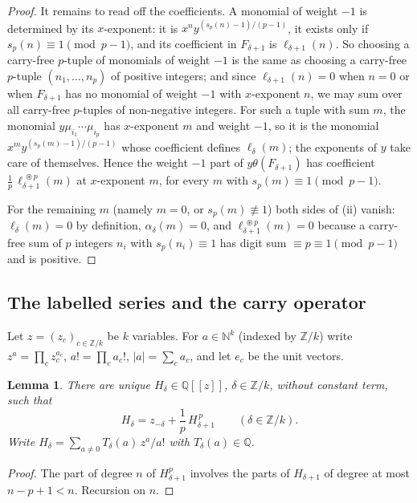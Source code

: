 \documentclass[11pt]{article}
\newtheorem{lemma}[theorem]{Lemma}
\theoremstyle{definition}
\theoremstyle{remark}
\numberwithin{equation}{section}
\numberwithin{figure}{section}
\newcommand{\Z}{\mathbb Z}
\newcommand{\Q}{\mathbb Q}
\newcommand{\N}{\mathbb N}
\newcommand{\cf}{\circledast}
\begin{document}
\begin{proof}
It remains to read off the coefficients. A monomial of weight $-1$ is determined by its
$x$-exponent: it is $x^ny^{(s_p(n)-1)/(p-1)}$, it exists only if $s_p(n)\equiv1\pmod{p-1}$,
and its coefficient in $F_{\delta+1}$ is $\ell_{\delta+1}(n)$. So choosing a carry-free
$p$-tuple of monomials of weight $-1$ is the same as choosing a carry-free $p$-tuple
$(n_1,\dots,n_p)$ of positive integers; and since $\ell_{\delta+1}(n)=0$ when $n=0$ or when
$F_{\delta+1}$ has no monomial of weight $-1$ with $x$-exponent $n$, we may sum over all
carry-free $p$-tuples of non-negative integers. For such a tuple with sum $m$, the monomial
$y\mu_{i_1}\cdots\mu_{i_p}$ has $x$-exponent $m$ and weight $-1$, so it is the monomial
$x^my^{(s_p(m)-1)/(p-1)}$ whose coefficient defines $\ell_\delta(m)$; the exponents of $y$
take care of themselves. Hence the weight $-1$ part of $y\theta(F_{\delta+1})$ has
coefficient $\frac1p\,\ell_{\delta+1}^{\;\cf p}(m)$ at $x$-exponent $m$, for every $m$ with
$s_p(m)\equiv1\pmod{p-1}$.

For the remaining $m$ (namely $m=0$, or $s_p(m)\not\equiv1$) both sides of (ii) vanish:
$\ell_\delta(m)=0$ by definition, $\alpha_\delta(m)=0$, and
$\ell_{\delta+1}^{\;\cf p}(m)=0$ because a carry-free sum of $p$ integers $n_i$ with
$s_p(n_i)\equiv1$ has digit sum $\equiv p\equiv1\pmod{p-1}$ and is positive.
\end{proof}

\subsection{The labelled series and the carry operator}

Let $z=(z_c)_{c\in\Z/k}$ be $k$ variables. For $a\in\N^k$ (indexed by $\Z/k$) write
$z^a=\prod_cz_c^{a_c}$, $a!=\prod_ca_c!$, $|a|=\sum_ca_c$, and let $e_c$ be the unit vectors.

\begin{lemma}\label{frob:lem:H}
There are unique $H_\delta\in\Q[[z]]$, $\delta\in\Z/k$, without constant term, such that
\begin{equation}\label{frob:eq:H}
 H_\delta=z_{-\delta}+\frac1p\,H_{\delta+1}^{\,p}\qquad(\delta\in\Z/k).
\end{equation}
Write $H_\delta=\sum_{a\ne0}T_\delta(a)\,z^a/a!$ with $T_\delta(a)\in\Q$.
\end{lemma}

\begin{proof}
The part of degree $n$ of $H_{\delta+1}^p$ involves the parts of $H_{\delta+1}$ of degree at
most $n-p+1<n$. Recursion on $n$.
\end{proof}
\end{document}
